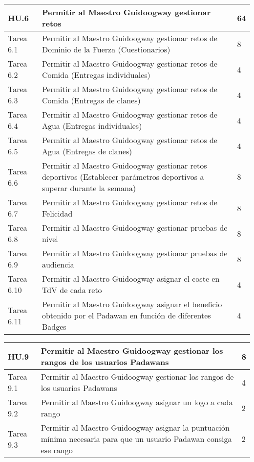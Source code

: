 \newpage

\begin{table}[b]
	\centering
	\begin{tabular}{| p{2.3cm} | p{6.7cm} | p{2cm} |}
		\rowcolor[HTML]{329A9D} 
		{\color[HTML]{FFFFFF} \textbf{HU.6}} & {\color[HTML]{FFFFFF} \textbf{Permitir al Maestro Guidoogway gestionar retos}} & {\color[HTML]{FFFFFF} \textbf{64}}  \\ \hline
		Tarea 6.1 & Permitir al Maestro Guidoogway gestionar retos de Dominio de la Fuerza (Cuestionarios) & 8 \\ \hline
		Tarea 6.2 & Permitir al Maestro Guidoogway gestionar retos de Comida (Entregas individuales) & 4 \\ \hline
		Tarea 6.3 & Permitir al Maestro Guidoogway gestionar retos de Comida (Entregas de clanes) & 4 \\ \hline
		Tarea 6.4 & Permitir al Maestro Guidoogway gestionar retos de Agua (Entregas individuales) & 4 \\ \hline
		Tarea 6.5 & Permitir al Maestro Guidoogway gestionar retos de Agua (Entregas de clanes) & 4 \\ \hline
		Tarea 6.6 & Permitir al Maestro Guidoogway gestionar retos deportivos (Establecer parámetros deportivos a superar durante la semana)& 8 \\ \hline
		Tarea 6.7 & Permitir al Maestro Guidoogway gestionar retos de Felicidad & 8 \\ \hline
		Tarea 6.8 & Permitir al Maestro Guidoogway gestionar pruebas de nivel & 8 \\ \hline
		Tarea 6.9 & Permitir al Maestro Guidoogway gestionar pruebas de audiencia & 8 \\ \hline
		Tarea 6.10 & Permitir al Maestro Guidoogway asignar el coste en TdV de cada reto & 4 \\ \hline
		Tarea 6.11 & Permitir al Maestro Guidoogway asignar el beneficio obtenido por el Padawan en función de diferentes Badges & 4 \\ \hline
	\end{tabular}
\end{table}
\newpage

\begin{table}[t]
	\centering
	\begin{tabular}{| p{2.3cm} | p{6.7cm} | p{2cm} |}
		\rowcolor[HTML]{329A9D} 
		{\color[HTML]{FFFFFF} \textbf{HU.9}} & {\color[HTML]{FFFFFF} \textbf{Permitir al Maestro Guidoogway gestionar los rangos de los usuarios Padawans}} & {\color[HTML]{FFFFFF} \textbf{8}}  \\ \hline
		Tarea 9.1 & Permitir al Maestro Guidoogway gestionar los rangos de los usuarios Padawans & 4 \\ \hline
		Tarea 9.2 & Permitir al Maestro Guidoogway asignar un logo a cada rango & 2 \\ \hline
		Tarea 9.3 & Permitir al Maestro Guidoogway asignar la puntuación mínima necesaria para que un usuario Padawan consiga ese rango & 2 \\ \hline
	\end{tabular}
\end{table}

